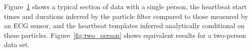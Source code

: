 \documentclass{article}
\begin{document}
Figure~\ref{fig:one_person} shows a typical section of data with a single person, the heartbeat start times and durations inferred by the particle filter compared to those measured by an ECG sensor, and the heartbeat templates inferred analytically conditional on these particles. Figure~\ref{fig:two_person} shows equivalent results for a two-person data set.

\begin{figure}
\centering
{} \\
 \\
\caption{}
\label{fig:one_person}
\end{figure}
\end{document}
